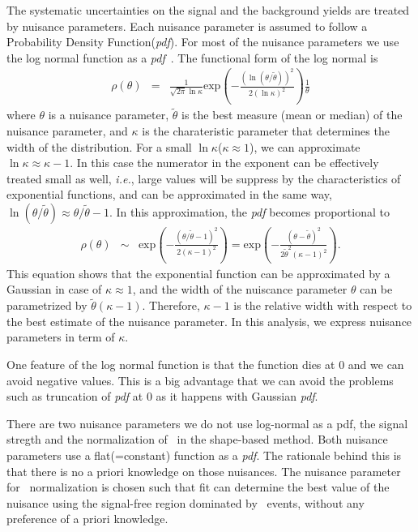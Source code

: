The systematic uncertainties on the signal and the background yields are 
treated by nuisance parameters. Each nuisance parameter is assumed to follow 
a Probability Density Function(\textit{pdf}).
For most of the nuisance parameters we use the log normal function as a 
\textit{pdf}~\cite{combination_stat}. The functional form of the log normal is 
\begin{eqnarray} 
\rho(\theta) 
&=& 
\frac{1}{\sqrt{2\pi}\ln\kappa}  
\textrm{exp} \left( - \frac{\left( \ln(\theta/\tilde{\theta})\right)^2}
                           {2(\ln\kappa)^2}  \right) 
\frac{1}{\theta}  
\end{eqnarray} 
where $\theta$ is a nuisance parameter, $\tilde{\theta}$ is the best measure 
(mean or median) of the nuisance parameter, and $\kappa$ is the charateristic 
parameter that determines the width of the distribution. 
For a small $\ln\kappa$($\kappa \approx 1$), we can approximate $\ln\kappa \approx \kappa - 1$.
In this case the numerator in the exponent can be effectively treated small as well,
\textit{i.e.}, large values will be suppress by the characteristics of exponential functions,  
and can be approximated in the same way, $\ln (\theta/\tilde{\theta}) \approx \theta/\tilde{\theta} - 1$.
In this approximation, the \textit{pdf} becomes proportional to 
\begin{eqnarray} 
\rho(\theta) 
&\sim&
\textrm{exp} \left( - \frac{\left( \theta/\tilde{\theta} - 1 \right)^2}
                           {2( \kappa - 1)^2}  \right)  
= 
\textrm{exp} \left( - \frac{\left( \theta - \tilde{\theta} \right)^2}
                           {2\tilde{\theta}^2 ( \kappa - 1)^2}  \right).  
\end{eqnarray} 
This equation shows that the exponential function can be 
approximated by a Gaussian in case of $\kappa \approx 1$, and the width 
of the nuiscance parameter $\theta$ can be parametrized by $\tilde{\theta}( \kappa - 1)$.
Therefore, $\kappa - 1$ is the relative width with respect to the best 
estimate of the nuisance parameter. In this analysis, we express nuisance parameters 
in term of $\kappa$.

One feature of the log normal function is that the function dies at 0
and we can avoid negative values. This is a big advantage that we can avoid 
the problems such as truncation of \textit{pdf} at 0 as it happens with Gaussian \textit{pdf}.    

There are two nuisance parameters we do not use log-normal as a pdf, 
the signal stregth and the normalization of \qqww\ in the shape-based method. 
Both nuisance parameters use a flat(=constant) function as a \textit{pdf}.  
The rationale behind this is that there is no a priori knowledge on those 
nuisances. The nuisance parameter for \qqww\ normalization is chosen 
such that fit can determine the best value of the nuisance using 
the signal-free region dominated by \qqww\ events, without any preference 
of a priori knowledge. 

